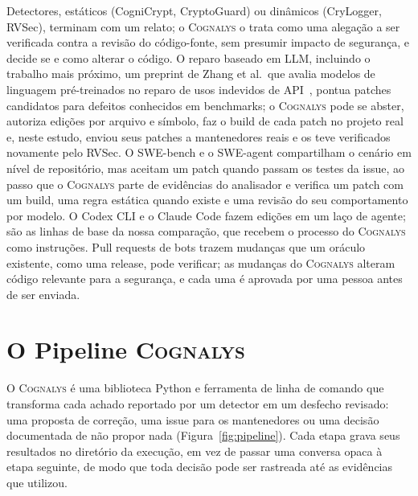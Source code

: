 \documentclass[conference]{IEEEtran}
\newcommand{\system}{\textsc{Cognalys}}
\begin{document}
Detectores, estáticos (CogniCrypt, CryptoGuard) ou dinâmicos (CryLogger,
RVSec), terminam com um relato; o \system{} o trata como uma alegação a ser
verificada contra a revisão do código-fonte, sem presumir impacto de segurança,
e decide se e como alterar o código. O reparo baseado em LLM, incluindo o
trabalho mais próximo, um preprint de Zhang et al.\ que avalia modelos de
linguagem pré-treinados no reparo de usos indevidos de
API~\cite{zhang2023apimisuse}, pontua patches candidatos para defeitos
conhecidos em benchmarks; o \system{} pode se abster, autoriza edições por
arquivo e símbolo, faz o build de cada patch no projeto real e, neste estudo,
enviou seus patches a mantenedores reais e os teve verificados novamente pelo
RVSec. O SWE-bench e o SWE-agent compartilham o cenário em nível de
repositório, mas aceitam um patch quando passam os testes da issue, ao passo
que o \system{} parte de evidências do analisador e verifica um patch com um
build, uma regra estática quando existe e uma revisão do seu comportamento por
modelo. O Codex CLI e o Claude Code fazem edições em um laço de agente; são as
linhas de base da nossa comparação, que recebem o processo do \system{} como
instruções. Pull requests de bots trazem mudanças que um oráculo existente,
como uma release, pode verificar; as mudanças do \system{} alteram código
relevante para a segurança, e cada uma é aprovada por uma pessoa antes de ser
enviada.

\section{O Pipeline \system{}}
\label{sec:pipeline}
\label{subsec:library}

O \system{} é uma biblioteca Python e ferramenta de linha de comando que
transforma cada achado reportado por um detector em um desfecho revisado: uma
proposta de correção, uma issue para os mantenedores ou uma decisão documentada
de não propor nada (Figura~\ref{fig:pipeline}). Cada etapa grava seus
resultados no diretório da execução, em vez de passar uma conversa opaca à
etapa seguinte, de modo que toda decisão pode ser rastreada até as evidências
que utilizou.
\end{document}
